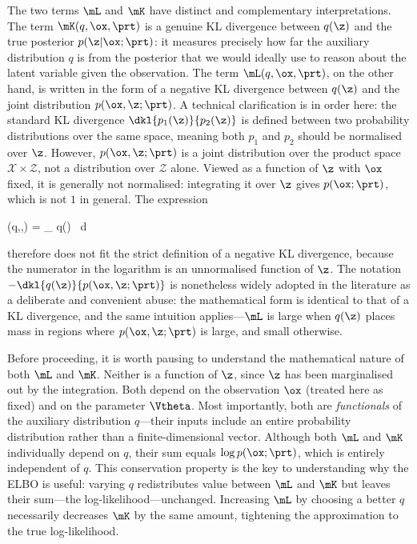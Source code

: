 The two terms $\mL$ and $\mK$ have distinct and complementary interpretations. The
term $\mK(q,\ox, \prt)$ is a genuine KL divergence between $q(\z)$ and the true posterior
$p(\z|\ox;\prt)$: it measures precisely how far the auxiliary distribution $q$ is from the
posterior that we would ideally use to reason about the latent variable given the observation.
The term $\mL(q,\ox, \prt)$, on the other hand, is written in the form of a negative KL
divergence between $q(\z)$ and the joint distribution $p(\ox,\z;\prt)$. A technical
clarification is in order here: the standard KL divergence $\dkl{p_1(\z)}{p_2(\z)}$ is
defined between two probability distributions over the same space, meaning both $p_1$ and
$p_2$ should be normalised over $\z$. However, $p(\ox,\z;\prt)$ is a joint distribution over
the product space $\mathcal{X} \times \mathcal{Z}$, not a distribution over $\mathcal{Z}$
alone. Viewed as a function of $\z$ with $\ox$ fixed, it is generally not normalised:
integrating it over $\z$ gives $p(\ox;\prt)$, which is not $1$ in general. The expression
\begin{myequation}
\mL(q,\ox,\prt) = \int_{\mZ} q(\z) \log {}\, d\z
\end{myequation}
therefore does not fit the strict definition of a negative KL divergence, because the
numerator in the logarithm is an unnormalised function of $\z$. The notation
$-\dkl{q(\z)}{p(\ox,\z;\prt)}$ is nonetheless widely adopted in the literature as a
deliberate and convenient abuse: the mathematical form is identical to that of a KL
divergence, and the same intuition applies---$\mL$ is large when $q(\z)$ places mass in
regions where $p(\ox,\z;\prt)$ is large, and small otherwise.

Before proceeding, it is worth pausing to understand the mathematical nature of both
$\mL$ and $\mK$. Neither is a function of $\z$, since $\z$ has been marginalised out by
the integration. Both depend on the observation $\ox$ (treated here as fixed) and on the
parameter $\Vtheta$. Most importantly, both are \emph{functionals} of the auxiliary
distribution $q$---their inputs include an entire probability distribution rather than a
finite-dimensional vector. Although both $\mL$ and $\mK$ individually depend on $q$,
their sum equals $\log p(\ox;\prt)$, which is entirely independent of $q$. This conservation
property is the key to understanding why the ELBO is useful: varying $q$ redistributes
value between $\mL$ and $\mK$ but leaves their sum---the log-likelihood---unchanged.
Increasing $\mL$ by choosing a better $q$ necessarily decreases $\mK$ by the same
amount, tightening the approximation to the true log-likelihood.


